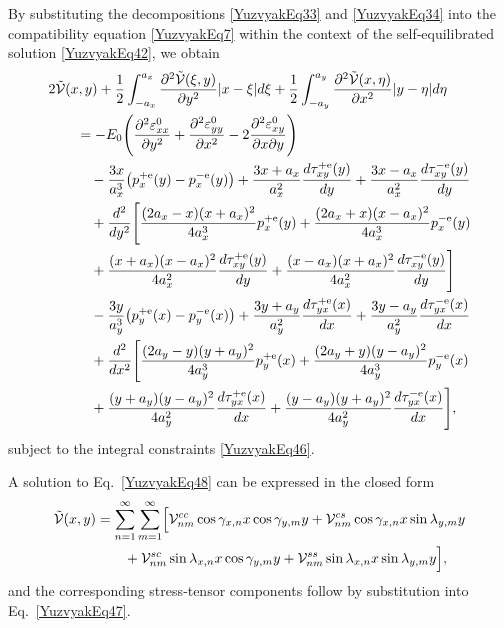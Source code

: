 By substituting the decompositions \eqref{YuzvyakEq33} and \eqref{YuzvyakEq34} into the compatibility equation \eqref{YuzvyakEq7} within the context of the self‑equilibrated solution \eqref{YuzvyakEq42}, we obtain
\begin{align}
	&2\tilde{\mathcal{V}}(x,y)
	+\frac{1}{2}\int_{-a_x}^{a_x}
	\frac{\partial^2\tilde{\mathcal{V}}(\xi ,y)}{\partial y^2}
	 |x-\xi| d\xi
	+\frac{1}{2}\int_{-a_y}^{a_y}
	\frac{\partial^2\tilde{\mathcal{V}}(x,\eta)}{\partial x^2}
	 |y-\eta| d\eta
	\notag\\
	&\qquad =-E_0\Biggl(
	\frac{\partial^2\varepsilon_{xx}^0}{\partial y^2}
	+\frac{\partial^2\varepsilon_{yy}^0}{\partial x^2}
	-2\frac{\partial^2\varepsilon_{xy}^0}{\partial x \partial y}
	\Biggr)
	\notag\\
	&\qquad\quad-\frac{3x}{a_x^3}\bigl(p_x^{+\mathrm e}(y)-p_x^{-\mathrm e}(y)\bigr)
	+\frac{3x+a_x}{a_x^2}\frac{d\tau_{xy}^{+\mathrm e}(y)}{dy}
	+\frac{3x-a_x}{a_x^2}\frac{d\tau_{xy}^{-\mathrm e}(y)}{dy}
	\notag\\
	&\qquad\quad+\frac{d^2}{dy^2}\Biggl[
	\frac{(2a_x-x)(x+a_x)^2}{4a_x^3}p_x^{+\mathrm e}(y)
	+\frac{(2a_x+x)(x-a_x)^2}{4a_x^3}p_x^{-\mathrm e}(y)
	\notag\\
	&\qquad\quad
	+\frac{(x+a_x)(x-a_x)^2}{4a_x^2}\frac{d\tau_{xy}^{+\mathrm e}(y)}{dy}
	+\frac{(x-a_x)(x+a_x)^2}{4a_x^2}\frac{d\tau_{xy}^{-\mathrm e}(y)}{dy}
	\Biggr]
	\notag\\
	&\qquad\quad-\frac{3y}{a_y^3}\bigl(p_y^{+\mathrm e}(x)-p_y^{-\mathrm e}(x)\bigr)
	+\frac{3y+a_y}{a_y^2}\frac{d\tau_{yx}^{+\mathrm e}(x)}{dx}
	+\frac{3y-a_y}{a_y^2}\frac{d\tau_{yx}^{-\mathrm e}(x)}{dx}
	\notag\\
	&\qquad\quad+\frac{d^2}{dx^2}\Biggl[
	\frac{(2a_y-y)(y+a_y)^2}{4a_y^3}p_y^{+\mathrm e}(x)
	+\frac{(2a_y+y)(y-a_y)^2}{4a_y^3}p_y^{-\mathrm e}(x)
	\notag\\
	&\qquad\quad +\frac{(y+a_y)(y-a_y)^2}{4a_y^2}\frac{d\tau_{yx}^{+\mathrm e}(x)}{dx}
	+\frac{(y-a_y)(y+a_y)^2}{4a_y^2}\frac{d\tau_{yx}^{-\mathrm e}(x)}{dx}
	\Biggr],
	\label{YuzvyakEq48}
\end{align}
subject to the integral constraints \eqref{YuzvyakEq46}.

A solution to Eq.~\eqref{YuzvyakEq48} can be expressed in the closed form
\begin{align}
	\tilde{\mathcal{V}}(x,y)
	&=\sum_{n=1}^{\infty}\sum_{m=1}^{\infty}\Bigl[
	\mathcal{V}_{nm}^{cc}\cos\gamma_{x,n}x \cos\gamma_{y,m}y
	+\mathcal{V}_{nm}^{cs}\cos\gamma_{x,n}x \sin\lambda_{y,m}y
	\notag\\
	&\qquad
	+\mathcal{V}_{nm}^{sc}\sin\lambda_{x,n}x \cos\gamma_{y,m}y
	+\mathcal{V}_{nm}^{ss}\sin\lambda_{x,n}x \sin\lambda_{y,m}y
	\Bigr],
	\label{YuzvyakEq49}
\end{align}
and the corresponding stress‑tensor components follow by substitution into Eq.~\eqref{YuzvyakEq47}.

